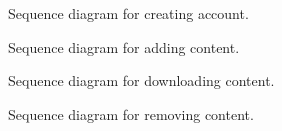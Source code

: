 
\begin{figure}[H]
\begin{center}	

	\caption{Sequence diagram for creating account.}
	\label{dia_sqns_crtaccnt}

\end{center}
\end{figure}

\begin{figure}[H]
\begin{center}	

	\caption{Sequence diagram for adding content.}
	\label{dia_sqns_addcntnt}

\end{center}
\end{figure}


\begin{figure}[H]
\begin{center}	

	\caption{Sequence diagram for downloading content.}
	\label{dia_sqns_dwnldcntnt}

\end{center}
\end{figure}

\begin{figure}[H]
\begin{center}	

	\caption{Sequence diagram for removing content.}
	\label{dia_sqns_rmvcntnt}

\end{center}
\end{figure}
